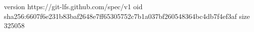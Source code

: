 version https://git-lfs.github.com/spec/v1
oid sha256:6607f6e231b83baf2648e7ff65305752c7b1a037bf260548364bc4db7f4ef3af
size 325058
